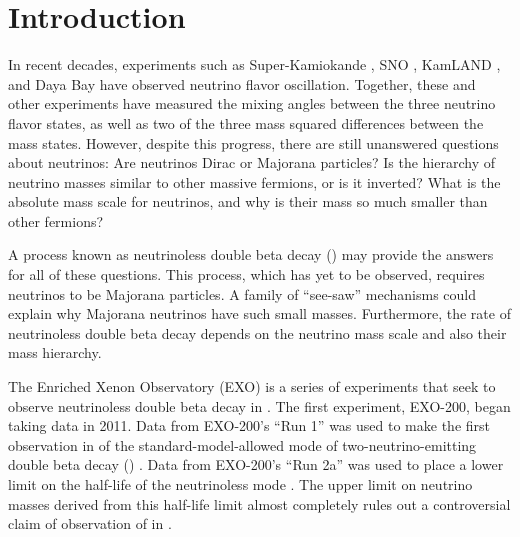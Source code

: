 \documentclass[herrin-thesis.tex]{subfiles}
\begin{document}
\chapter{Introduction}

In recent decades, experiments such as Super-Kamiokande \cite{Fukuda:1998zr}, SNO \cite{Ahmad:2001ys}, KamLAND \cite{PhysRevLett.90.021802}, and Daya Bay \cite{PhysRevLett.108.171803} have observed neutrino flavor oscillation. Together, these and other experiments have measured the mixing angles between the three neutrino flavor states, as well as two of the three mass squared differences between the mass states. However, despite this progress, there are still unanswered questions about neutrinos: Are neutrinos Dirac or Majorana particles? Is the hierarchy of neutrino masses similar to other massive fermions, or is it inverted? What is the absolute mass scale for neutrinos, and why is their mass so much smaller than other fermions?

A process known as neutrinoless double beta decay (\zeronu{}) may provide the answers for all of these questions. This process, which has yet to be observed, requires neutrinos to be Majorana particles. A family of ``see-saw'' mechanisms could explain why Majorana neutrinos have such small masses. Furthermore, the rate of neutrinoless double beta decay depends on the neutrino mass scale and also their mass hierarchy.

The Enriched Xenon Observatory (EXO) is a series of experiments that seek to observe neutrinoless double beta decay in . The first experiment, EXO-200, began taking data in 2011. Data from EXO-200's ``Run 1'' was used to make the first observation in  of the standard-model-allowed mode of two-neutrino-emitting double beta decay (\twonu) \cite{Ackerman:2011gz}. Data from EXO-200's ``Run 2a'' was used to place a lower limit on the half-life of the neutrinoless mode \cite{Auger:2012ar}. The upper limit on neutrino masses derived from this half-life limit almost completely rules out a controversial claim of observation of \zeronu{} in  \cite{KlapdorKleingrothaus:2006ff}.
\end{document}
